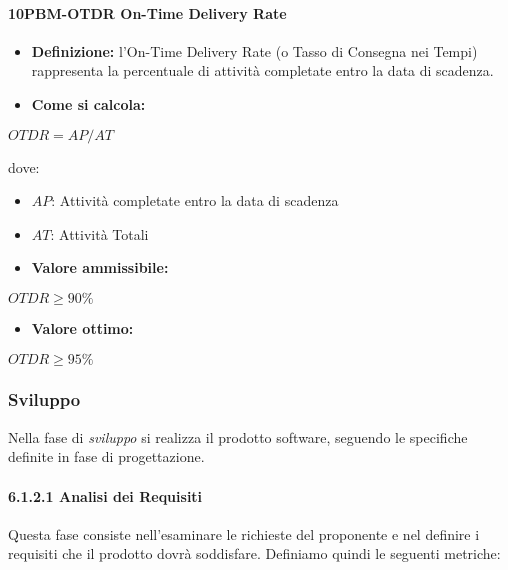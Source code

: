 \paragraph*{10PBM-OTDR On-Time Delivery Rate}
\begin{itemize}
    \item \textbf{Definizione:} l’On-Time Delivery Rate (o Tasso di Consegna nei Tempi) rappresenta la percentuale di attività completate entro la data di scadenza.
    \item \textbf{Come si calcola:}
\end{itemize}
\begin{center}
   $OTDR = AP/AT$ 
\end{center}
dove:
\begin{itemize}[label=$\rightarrow$]
    \item $AP$: Attività completate entro la data di scadenza
    \item $AT$: Attività Totali
\end{itemize}
\begin{itemize}
    \item \textbf{Valore ammissibile:}
\end{itemize}
\begin{center}
    $OTDR \geq 90\%$
\end{center}
\begin{itemize}
    \item \textbf{Valore ottimo:}
\end{itemize}
\begin{center}
    $OTDR \geq 95\%$
\end{center}

\subsubsection{Sviluppo}
Nella fase di \emph{sviluppo} si realizza il prodotto software, seguendo le specifiche definite in fase di progettazione.
\paragraph*{6.1.2.1 Analisi dei Requisiti}
Questa fase consiste nell'esaminare le richieste del proponente e nel definire i requisiti che il prodotto dovrà soddisfare. Definiamo quindi le seguenti metriche:

